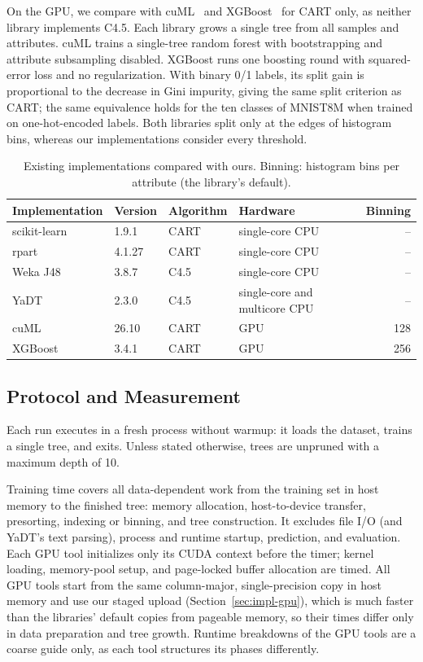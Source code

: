 On the GPU, we compare with cuML~\cite{raschka2020cuml} and XGBoost~\cite{chen2016xgboost} for CART only, as neither library implements C4.5. Each library grows a single tree from all samples and attributes. cuML trains a single-tree random forest with bootstrapping and attribute subsampling disabled. XGBoost runs one boosting round with squared-error loss and no regularization. With binary 0/1 labels, its split gain is proportional to the decrease in Gini impurity, giving the same split criterion as CART; the same equivalence holds for the ten classes of MNIST8M when trained on one-hot-encoded labels. Both libraries split only at the edges of histogram bins, whereas our implementations consider every threshold.

\begin{table}
\caption{Existing implementations compared with ours. Binning: histogram bins per attribute (the library's default).}
\label{tab:compared}
\centering
\begin{tabular}{@{}llllr@{}}
\toprule
Implementation & Version & Algorithm & Hardware & Binning \\
\midrule
scikit-learn & 1.9.1  & CART & single-core CPU                & -- \\
rpart        & 4.1.27 & CART & single-core CPU                & -- \\
Weka J48     & 3.8.7  & C4.5 & single-core CPU                & -- \\
YaDT         & 2.3.0  & C4.5 & single-core and multicore CPU  & -- \\
cuML         & 26.10  & CART & GPU                            & 128 \\
XGBoost      & 3.4.1  & CART & GPU                            & 256 \\
\bottomrule
\end{tabular}
\end{table}

\subsection{Protocol and Measurement}
\label{sec:protocol}

Each run executes in a fresh process without warmup: it loads the dataset, trains a single tree, and exits. Unless stated otherwise, trees are unpruned with a maximum depth of 10.

Training time covers all data-dependent work from the training set in host memory to the finished tree: memory allocation, host-to-device transfer, presorting, indexing or binning, and tree construction. It excludes file I/O (and YaDT's text parsing), process and runtime startup, prediction, and evaluation. Each GPU tool initializes only its CUDA context before the timer; kernel loading, memory-pool setup, and page-locked buffer allocation are timed. All GPU tools start from the same column-major, single-precision copy in host memory and use our staged upload (Section~\ref{sec:impl-gpu}), which is much faster than the libraries' default copies from pageable memory, so their times differ only in data preparation and tree growth. Runtime breakdowns of the GPU tools are a coarse guide only, as each tool structures its phases differently.

